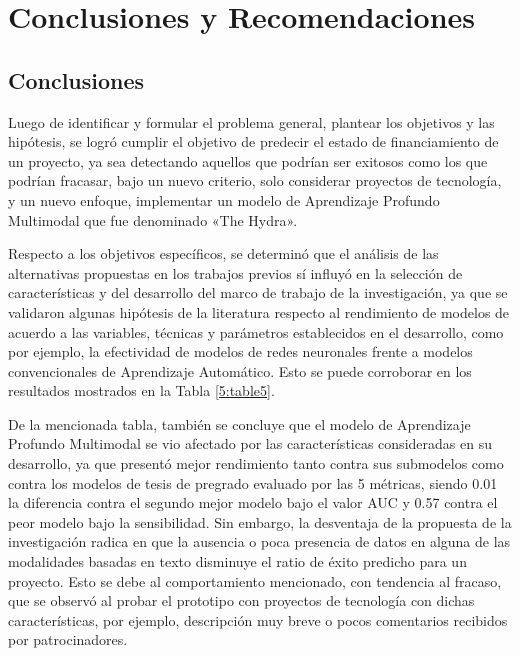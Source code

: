 \chapter{Conclusiones y Recomendaciones}
\section{Conclusiones}
Luego de identificar y formular el problema general, plantear los objetivos y las hipótesis, se logró cumplir el objetivo de predecir el estado de financiamiento de un proyecto, ya sea detectando aquellos que podrían ser exitosos como los que podrían fracasar, bajo un nuevo criterio, solo considerar proyectos de tecnología, y un nuevo enfoque, implementar un modelo de Aprendizaje Profundo Multimodal que fue denominado «The Hydra».

Respecto a los objetivos específicos, se determinó que el análisis de las alternativas propuestas en los trabajos previos sí influyó en la selección de características y del desarrollo del marco de trabajo de la investigación, ya que se validaron algunas hipótesis de la literatura respecto al rendimiento de modelos de acuerdo a las variables, técnicas y parámetros establecidos en el desarrollo, como por ejemplo, la efectividad de modelos de redes neuronales frente a modelos convencionales de Aprendizaje Automático. Esto se puede corroborar en los resultados mostrados en la Tabla \ref{5:table5}.

De la mencionada tabla, también se concluye que el modelo de Aprendizaje Profundo Multimodal se vio afectado por las características consideradas en su desarrollo, ya que presentó mejor rendimiento tanto contra sus submodelos como contra los modelos de tesis de pregrado evaluado por las 5 métricas, siendo 0.01 la diferencia contra el segundo mejor modelo bajo el valor AUC y 0.57 contra el peor modelo bajo la sensibilidad. Sin embargo, la desventaja de la propuesta de la investigación radica en que la ausencia o poca presencia de datos en alguna de las modalidades basadas en texto disminuye el ratio de éxito predicho para un proyecto. Esto se debe al comportamiento mencionado, con tendencia al fracaso, que se observó al probar el prototipo con proyectos de tecnología con dichas características, por ejemplo, descripción muy breve o pocos comentarios recibidos por patrocinadores.

